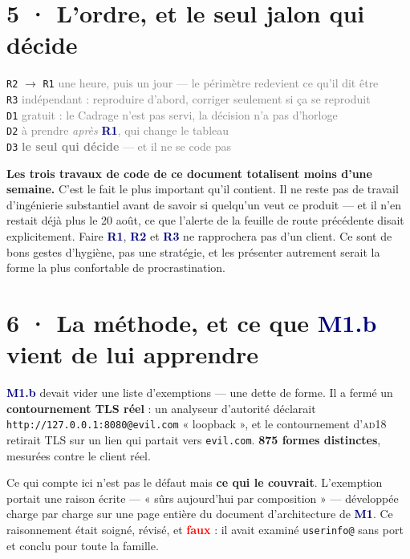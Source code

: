 \documentclass[10pt]{article}
\newcommand{\pire}[1]{\textcolor{red}{\textbf{#1}}}
\newcommand{\sz}[1]{\textcolor{grey}{\small\textsf{#1}}}
\newcommand{\code}[1]{\texttt{\small #1}}
\newcommand{\fl}{$\rightarrow$}
\newcommand{\mm}[1]{\textbf{\textcolor{navy}{#1}}}
\begin{document}
\section{5 · L'ordre, et le seul jalon qui décide}

\begin{extrait}
\small
\code{R2} \fl{} \code{R1} \hfill \sz{une heure, puis un jour --- le périmètre redevient ce qu'il dit être} \\
\code{R3} \hfill \sz{indépendant : reproduire d'abord, corriger seulement si ça se reproduit} \\
\code{D1} \hfill \sz{gratuit : le Cadrage n'est pas servi, la décision n'a pas d'horloge} \\
\code{D2} \hfill \sz{à prendre \emph{après} \mm{R1}, qui change le tableau} \\[3pt]
\code{D3} \hfill \sz{\textbf{le seul qui décide} --- et il ne se code pas}
\end{extrait}

\begin{alerte}
\textbf{Les trois travaux de code de ce document totalisent moins d'une semaine.} C'est le fait le
plus important qu'il contient. Il ne reste pas de travail d'ingénierie substantiel avant de savoir
si quelqu'un veut ce produit --- et il n'en restait déjà plus le 20 août, ce que l'alerte de la
feuille de route précédente disait explicitement. Faire \mm{R1}, \mm{R2} et \mm{R3} ne rapprochera
pas d'un client. Ce sont de bons gestes d'hygiène, pas une stratégie, et les présenter autrement
serait la forme la plus confortable de procrastination.
\end{alerte}

\section{6 · La méthode, et ce que \mm{M1.b} vient de lui apprendre}

\mm{M1.b} devait vider une liste d'exemptions --- une dette de forme. Il a fermé un
\textbf{contournement TLS réel} : un analyseur d'autorité déclarait
\code{http://127.0.0.1:8080@evil.com} « loopback », et le contournement d'\textsc{ad18} retirait TLS
sur un lien qui partait vers \code{evil.com}. \textbf{875 formes distinctes}, mesurées contre le
client réel.

Ce qui compte ici n'est pas le défaut mais \textbf{ce qui le couvrait}. L'exemption portait une
raison écrite --- « sûrs aujourd'hui par composition » --- développée charge par charge sur une
page entière du document d'architecture de \mm{M1}. Ce raisonnement était soigné, révisé, et
\pire{faux} : il avait examiné \code{userinfo@} sans port et conclu pour toute la famille.
\end{document}
